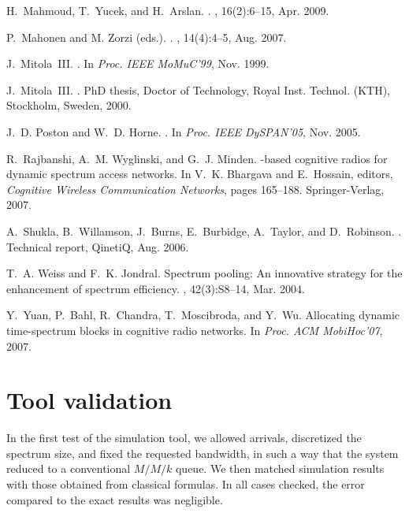 \documentclass{amsart}
\begin{document}
\begin{thebibliography}{10}
H.~Mahmoud, T.~Yucek, and H.~Arslan.
.
, 16(2):6--15, Apr. 2009.

P.~Mahonen and {M. Zorzi (eds.)}.
.
, 14(4):4--5, Aug.
  2007.

J.~Mitola~III.
.
\newblock In {\em {Proc. IEEE MoMuC'99}}, Nov. 1999.

J.~Mitola~III.
.
\newblock PhD thesis, Doctor of Technology, Royal Inst. Technol. (KTH),
  Stockholm, Sweden, 2000.

J.~D. Poston and W.~D. Horne.
.
\newblock In {\em Proc. IEEE DySPAN'05}, Nov. 2005.

R.~Rajbanshi, A.~M. Wyglinski, and G.~J. Minden.
-based cognitive radios for dynamic spectrum access networks.
\newblock In V.~K. Bhargava and E.~Hossain, editors, {\em Cognitive Wireless
  Communication Networks}, pages 165--188. Springer-Verlag, 2007.

A.~Shukla, B.~Willamson, J.~Burns, E.~Burbidge, A.~Taylor, and D.~Robinson.
.
\newblock Technical report, QinetiQ, Aug. 2006.

T.~A. Weiss and F.~K. Jondral.
\newblock Spectrum pooling: An innovative strategy for the enhancement of
  spectrum efficiency.
, 42(3):S8--14, Mar. 2004.

Y.~Yuan, P.~Bahl, R.~Chandra, T.~Moscibroda, and Y.~Wu.
\newblock Allocating dynamic time-spectrum blocks in cognitive radio networks.
\newblock In {\em Proc. ACM MobiHoc'07}, 2007.

\end{thebibliography}

\normalsize

\clearpage

\appendix


\section{Tool validation}
\label{app:validation}
In the first test of the simulation tool, we allowed arrivals, discretized
the spectrum size, and fixed the requested bandwidth, in such a way that
the system reduced to a conventional $M/M/k$ queue.  We then
matched simulation results with those obtained from classical formulas.
In all cases checked, the error compared to the exact results was negligible.
\end{document}
